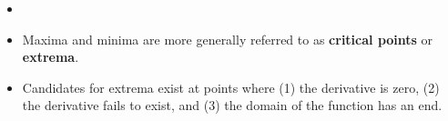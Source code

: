 \documentclass[../main.tex]{subfiles}
\begin{document}
\begin{itemize}
    \begin{align*}
        f'(a^+) &= \lim_{h\to 0^+}\frac{f(x+h)-f(x)}{h}&
        f'(b^-) &= \lim_{h\to 0^-}\frac{f(x+h)-f(x)}{h}
    \end{align*}
    may exist. These are called the \textbf{right-hand derivative} and \textbf{left-hand derivative} respectively.
    \begin{itemize}
        \item It's imprecise to say that $f$ is differentiable at these endpoints, but many mathematicians will allow it\footnote{Really?} as they expect us to just know that what is really meant is it is differentiable on $(a,b)$ and one-side differentiable at the endpoints.
    \end{itemize}
    \item {}
    \item Maxima and minima are more generally referred to as \textbf{critical points} or \textbf{extrema}.
    \item Candidates for extrema exist at points where (1) the derivative is zero, (2) the derivative fails to exist, and (3) the domain of the function has an end.
\end{itemize}
\end{document}
